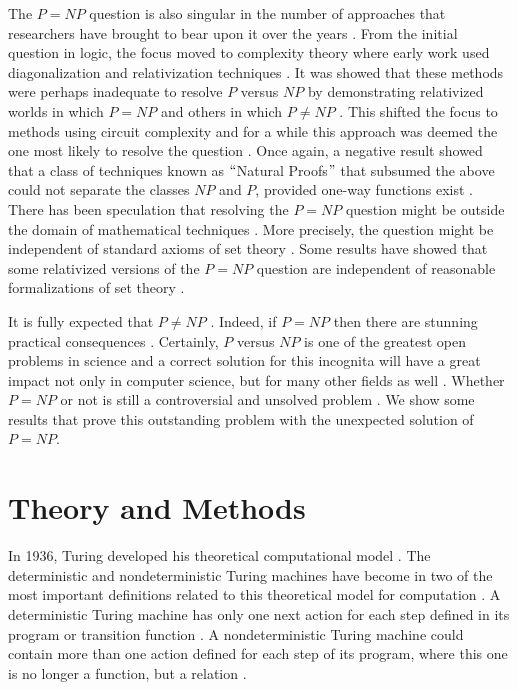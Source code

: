 \documentclass[a4paper,UKenglish,cleveref, autoref]{lipics-v2019}
\begin{document}
The $P = NP$ question is also singular in the number of approaches that researchers have brought to bear upon it over the years \cite{DEO10}. From the initial question in logic, the focus moved to complexity theory where early work used diagonalization and relativization techniques \cite{DEO10}. It was showed that these methods were perhaps inadequate to resolve $P$ versus $NP$ by demonstrating relativized worlds in which $P = NP$ and others in which $P \neq NP$ \cite{BA75}. This shifted the focus to methods using circuit complexity and for a while this approach was deemed the one most likely to resolve the question \cite{DEO10}. Once again, a negative result showed that a class of techniques known as $``$Natural Proofs$"$ that subsumed the above could not separate the classes $NP$ and $P$, provided one-way functions exist \cite{RAZ97}. There has been speculation that resolving the $P = NP$ question might be outside the domain of mathematical techniques \cite{DEO10}. More precisely, the question might be independent of standard axioms of set theory \cite{DEO10}. Some results have showed that some relativized versions of the $P = NP$ question are independent of reasonable formalizations of set theory \cite{HOP76}.

It is fully expected that $P \neq NP$ \cite{Pap03}. Indeed, if $P = NP$ then there are stunning practical consequences \cite{Pap03}. Certainly, $P$ versus $NP$ is one of the greatest open problems in science and a correct solution for this incognita will have a great impact not only in computer science, but for many other fields as well \cite{AS17}. Whether $P = NP$ or not is still a controversial and unsolved problem \cite{AS17}. We show some results that prove this outstanding problem with the unexpected solution of $P = NP$.

\section{Theory and Methods}

In 1936, Turing developed his theoretical computational model \cite{MS06}. The deterministic and nondeterministic Turing machines have become in two of the most important definitions related to this theoretical model for computation \cite{MS06}. A deterministic Turing machine has only one next action for each step defined in its program or transition function \cite{MS06}. A nondeterministic Turing machine could contain more than one action defined for each step of its program, where this one is no longer a function, but a relation \cite{MS06}.
\end{document}
